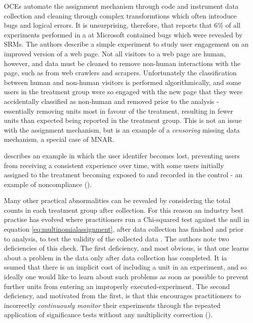 \documentclass[11pt]{article}
\begin{document}
OCEs automate the assignment mechanism through code and instrument data collection and cleaning through complex transformtions which often introduce bugs and logical errors. It is unsurprising, therefore, that \cite{fabijan} reports that 6\% of all experiments performed in a at Microsoft contained bugs which were revealed by SRMs. The authors describe a simple experiment to study user engagement on an improved version of a web page. Not all visitors to a web page are human, however, and data must be cleaned to remove non-human interactions with the page, such as from web crawlers and scrapers. Unfortunately the classification between human and non-human visitors is performed algorithmically, and some users in the treatment group were so engaged with the new page that they were accidentally classified as non-human and removed prior to the analysis - essentially removing units most in favour of the treatment, resulting in fewer units than expected being reported in the treatment group. This is not an issue with the assignment mechanism, but is an example of a \textit{censoring} missing data mechanism, a special case of MNAR.

\cite{zhao} describes an example in which the user identifer becomes lost, preventing users from receiving a consistent experience over time, with some users initially assigned to the treatment becoming exposed to and recorded in the control - an example of noncompliance (\cite{imbens}). 

Many other practical abnormalities can be revealed by considering the total counts in each treatment group after collection. For this reason an industry best practise has evolved where practitioners run a Chi-squared test against the null in equation \eqref{eq:multinomialassignment}, after data collection has finished and prior to analysis, to test the validity of the collected data \cite{linkedin}.
The authors note two deficiencies of this check. The first deficiency, and most obvious, is that one learns about a problem in the data only after data collection has completed. It ia ssumed that there is an implicit cost of including a unit in an experiment, and so ideally one would like to learn about such problems as soon as possible to prevent further units from entering an improperly executed-experiment. The second deficiency, and motivated from the first, is that this encourages practitioners to incorrectly \textit{continuously monitor} their experiments through the repeated application of significance tests without any multiplicity correction (\cite{armitage}).
\end{document}
